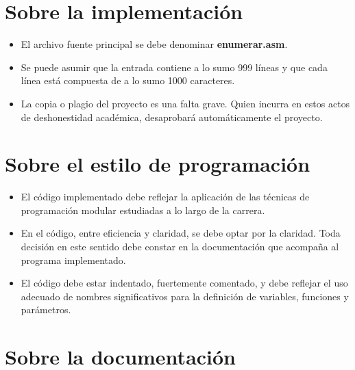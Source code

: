 \documentclass[12pt,a4paper]{article}
\begin{document}
\section*{Sobre la implementación}
\begin{itemize}
	
	\item El archivo fuente principal se debe denominar \textbf{\textsf{enumerar.asm}}.
	
	\item Se puede asumir que la entrada contiene a lo sumo 999 líneas y que cada línea está compuesta de a lo sumo 1000 caracteres.
	
	\item La copia o plagio del proyecto es una falta grave. Quien incurra en estos actos de deshonestidad académica, desaprobará automáticamente el proyecto.
\end{itemize}

\section*{Sobre el estilo de programación}
\begin{itemize}
		
	\item El código implementado debe reflejar la aplicación de las técnicas de programación modular estudiadas a lo largo de la carrera.
	
	\item En el código, entre eficiencia y claridad, se debe optar por la claridad. Toda decisión en este sentido debe constar en la documentación que acompaña al programa implementado.
	
	\item El código debe estar indentado, fuertemente comentado, y debe reflejar el uso adecuado de nombres significativos para la definición de variables, funciones y parámetros.
	
\end{itemize}

\section*{Sobre la documentación}
\end{document}
